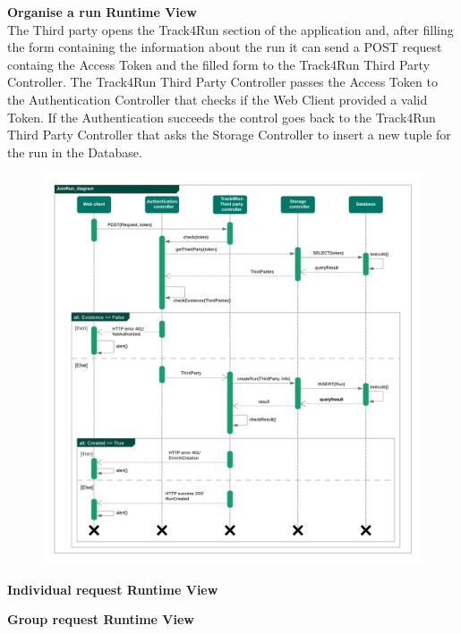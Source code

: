 \begin{legal}
\begin{legal}
				\newpage
				\item \textbf{Organise a run Runtime View}\\
The Third party opens the Track4Run section of the application and, after filling the form containing the information about the run it can send a POST request containg the Access Token and the filled form to the Track4Run Third Party Controller.
The Track4Run Third Party Controller passes the Access Token to the Authentication Controller that checks if the Web Client provided a valid Token.
If the Authentication succeeds the control goes back to the Track4Run Third Party Controller that asks the Storage Controller to insert a new tuple for the run in the Database.
				\begin{figure}[H]
				\includegraphics[width=\linewidth]{images/seq_diagrams/seq_OrganizeRun.png}\\
				\end{figure}
				
				\newpage
				\item \textbf{Individual request Runtime View}\\
				
				\newpage
				\item \textbf{Group request Runtime View}\\
				

\end{legal}
\end{legal}
